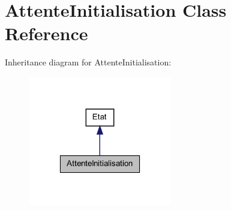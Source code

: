 \hypertarget{class_attente_initialisation}{
\section{AttenteInitialisation Class Reference}
\label{class_attente_initialisation}
}


Inheritance diagram for AttenteInitialisation:
\nopagebreak
\begin{figure}[H]
\begin{center}
\leavevmode
\includegraphics[width=178pt]{class_attente_initialisation__inherit__graph}
\end{center}
\end{figure}


